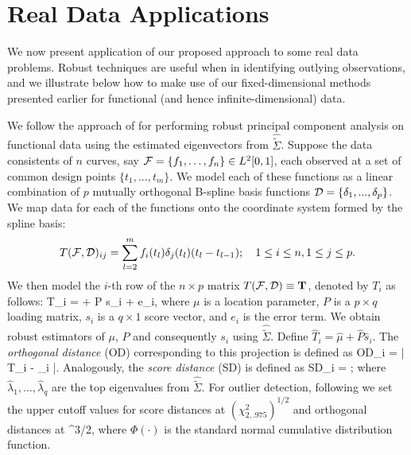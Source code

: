 \section{Real Data Applications}
\label{Sec:DA}

We now present application of our proposed approach to some real data problems. Robust techniques are useful when in identifying outlying observations, and we illustrate below how to make use of our fixed-dimensional methods presented earlier for functional (and hence infinite-dimensional)  data. 

We follow the approach of \cite{ref:JASA151100_BoenteSalibianBarrera} 
for performing robust principal component 
analysis on functional data using the estimated eigenvectors from 
$\widehat{\tilde{\Sigma}}$. Suppose the data consistents of  $n$ curves, say 
$ \mathcal{F} = \{ f_1, \ldots , f_n  \} \in L^2[0,1]$, each observed at a set of common design 
points $\{ t_1, ..., t_m \} $. We model each of these functions as a linear combination of 
$p$ mutually orthogonal B-spline basis functions $\mathcal{D} = \{ \delta_1, ..., \delta_p \}$. We map data for each of the functions onto the coordinate system formed by the spline basis:
%
\begin{equation}
T( \mathcal{F}, \mathcal{D})_{ij} = \sum_{l=2}^m f_i(t_l) \delta_j(t_l) (t_l - t_{l-1}); \quad 1 \leq i \leq n, 1 \leq j \leq p.
\end{equation}
%
We then model  the $i$-th row of the $n \times p$ matrix $T(\mathcal{F}, \mathcal{D}) \equiv {\mathbf{T}}$, 
denoted by $T_{i}$ 
as follows:
\ban 
T_i = \mu + P s_i + e_{i},
\ean
where $\mu$ is a location parameter, $P$ is a $p \times q$ loading matrix, $s_{i}$ is 
a $q \times 1$ score vector, and $e_{i}$ is the error term. We obtain robust estimators of 
$\mu$, $P$ and consequently $s_{i}$ using $\widehat{\tilde{\Sigma}}$. Define 
$\widehat{T}_{i} = \hat{\mu} + \hat{P} \hat{s}_{i}$. 
The \textit{orthogonal distance} (OD)  corresponding to this projection is defined as 
\ban 
OD_{i} = | T_i - _{i} |.
\ean
Analogously, the \textit{score distance} (SD) is defined as 
\ban 
SD_i = ; 
\ean
where $\hat \lambda_1,\ldots ,\hat \lambda_q$ are the top eigenvalues from 
$\widehat{\tilde{\Sigma}}$. 
For outlier detection, following \cite{ref:Technometrics0564_Hubertetal} 
we set the upper cutoff values for 
score distances at $(\chi^2_{2, .975})^{1/2}$ and orthogonal distances at 
^{3/2},
\ean
 where 
$\Phi(\cdot)$ is the standard normal cumulative distribution function.

